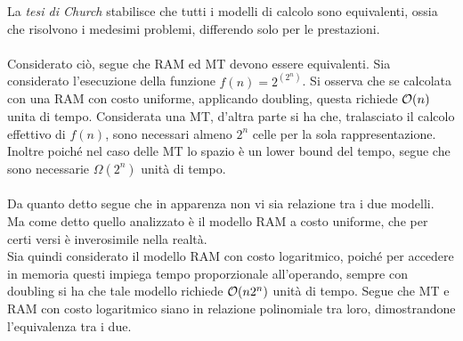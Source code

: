 \documentclass{article}
\begin{document}
La \emph{tesi di Church} stabilisce che tutti i modelli di calcolo sono equivalenti, ossia che risolvono i medesimi problemi, differendo solo per le prestazioni.
\\ \\
Considerato ciò, segue che RAM ed MT devono essere equivalenti.
Sia considerato l'esecuzione della funzione \(f(n) = 2^{(2^{n})}\).
Si osserva che se calcolata con una RAM con costo uniforme, applicando doubling, questa richiede \(\order{n}\) unita di tempo.
Considerata una MT, d'altra parte si ha che, tralasciato il calcolo effettivo di \(f(n)\), sono necessari almeno \(2^{n}\) celle per la sola rappresentazione.
Inoltre poiché nel caso delle MT lo spazio è un lower bound del tempo, segue che sono necessarie \(\Omega(2^{n})\) unità di tempo.
\\ \\
Da quanto detto segue che in apparenza non vi sia relazione tra i due modelli.
Ma come detto quello analizzato è il modello RAM a costo uniforme, che per certi versi è inverosimile nella realtà.
\\
Sia quindi considerato il modello RAM con costo logaritmico, poiché per accedere in memoria questi impiega tempo proporzionale all'operando,
sempre con doubling si ha che tale modello richiede \(\order{n2^{n}}\) unità di tempo.
Segue che MT e RAM con costo logaritmico siano in relazione polinomiale tra loro, dimostrandone l'equivalenza tra i due.
\end{document}
